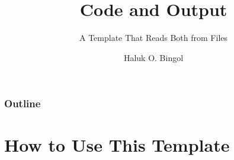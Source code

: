 \documentclass[aspectratio=169,10pt,compress]{beamer}
\title{Code and Output}
\subtitle{A Template That Reads Both from Files}
\author[Bingol]{Haluk O. Bingol}
\institute[FCIS]{
    Faculty of Computer and Information Sciences\\
    Yeditepe University
}
\date{
	{\tiny \hbTimeStamp}
}
\begin{document}
\begin{frame}[t,fragile]
  \titlepage
\end{frame}




\begin{frame}[t,fragile] \frametitle{Outline}
  \tableofcontents[hideallsubsections]
\end{frame}

\section[Usage]{How to Use This Template}
\end{document}
